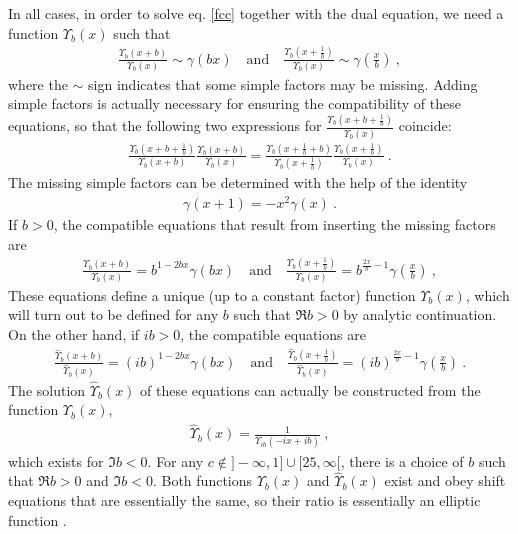 \documentclass[12pt, a4paper, notitlepage, twoside]{report}
\numberwithin{equation}{section}
\theoremstyle{break}
\begin{document}
In all cases, in order to solve eq. \eqref{fcc} together with the dual equation, we need a function $\Upsilon_b(x)$ such that 
\begin{align}
 \frac{\Upsilon_b(x+b)}{\Upsilon_b(x)} \sim \gamma(bx)\quad \text{and} \quad \frac{\Upsilon_b(x+\frac{1}{b})}{\Upsilon_b(x)} \sim \gamma(\tfrac{x}{b})\ ,
\end{align}
where the $\sim$ sign indicates that some simple factors may be missing.
Adding simple factors is actually necessary for ensuring the compatibility of these equations, so that the following two expressions for $ \frac{\Upsilon_b(x+b+\frac{1}{b})}{\Upsilon_b(x)}$ coincide:
\begin{align}
  \frac{\Upsilon_b(x+b+\frac{1}{b})}{\Upsilon_b(x+b)} \frac{\Upsilon_b(x+b)}{\Upsilon_b(x)} = \frac{\Upsilon_b(x+\frac{1}{b}+b)}{\Upsilon_b(x+\frac{1}{b})} \frac{\Upsilon_b(x+\frac{1}{b})}{\Upsilon_b(x)} \ .
\end{align}
The missing simple factors can be determined with the help of the identity
\begin{align}
 \gamma(x+1) = -x^2 \gamma(x) \ .
\end{align}
If $b>0$, the compatible equations that result from inserting the missing factors are 
\begin{align}
  \boxed{\frac{\Upsilon_b(x+b)}{\Upsilon_b(x)} = b^{1-2bx} \gamma(bx)}\quad \text{and} \quad \boxed{\frac{\Upsilon_b(x+\frac{1}{b})}{\Upsilon_b(x)} = b^{\frac{2x}{b}-1} \gamma(\tfrac{x}{b})}\ ,
\label{upup}
\end{align}
These equations define a unique (up to a constant factor) function $\Upsilon_b(x)$, which will turn out to be defined for any $b$ such that $\Re b > 0$ by analytic continuation. 
On the other hand, if $ib>0$, the compatible equations are 
\begin{align}
 \frac{\hat{\Upsilon}_b(x+b)}{\hat{\Upsilon}_b(x)} = (ib)^{1-2bx} \gamma(bx)\quad \text{and} \quad \frac{\hat{\Upsilon}_b(x+\frac{1}{b})}{\hat{\Upsilon}_b(x)} = (ib)^{\frac{2x}{b}-1} \gamma(\tfrac{x}{b})\ .
\end{align}
The solution $\hat\Upsilon_b(x)$ of these equations can actually be constructed from the function $\Upsilon_b(x)$,
\begin{align}
 \boxed{ \hat{\Upsilon}_b(x) = \frac{1}{\Upsilon_{ib}(-ix+ib)} }\ ,
\label{tub}
\end{align}
which exists for $\Im b < 0$. 
For any $c\notin ]-\infty, 1] \cup [25,\infty[$, there is a choice of $b$ such that $\Re b>0$ and $\Im b<0$. 
Both functions $\Upsilon_b(x)$ and $\hat\Upsilon_b(x)$ exist and obey shift equations that are essentially the same, so their ratio is essentially an elliptic function \cite{zam05}. 
\end{document}
